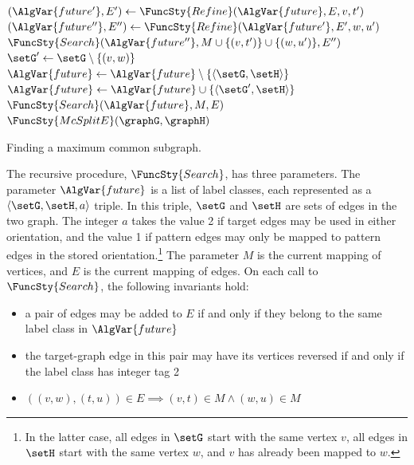 \begin{algorithm}[htb]
{{{{\nl          $(\AlgVar{future'}, E') \gets \FuncSty{Refine}(\AlgVar{future}, E, v, t')$ \;
\nl          $(\AlgVar{future''}, E'') \gets \FuncSty{Refine}(\AlgVar{future'}, E', w, u')$ \;
\nl          $\FuncSty{Search}(\AlgVar{future''}, M\cup \{(v,t')\} \cup \{(w,u')\}, E'')$ \label{ExpandWithtu} \;
        }
       } 
  }
\nl $\setG' \gets \setG \setminus \{(v,w)\}$ \label{RemoveVW} \;
\nl $\AlgVar{future} \gets \AlgVar{future} \setminus \{\langle \setG,\setH \rangle\}$\;
\nl {} {$\AlgVar{future} \gets \AlgVar{future} \cup \{\langle \setG',\setH \rangle \}$}
\nl $\FuncSty{Search}(\AlgVar{future},M,E)$ \label{ExpandWithoutVW} \;
}
\;
\nl $\FuncSty{McSplitE}(\graphG,\graphH)$ \label{McSplitFun} \;
\nl {}
\caption{Finding a maximum common subgraph.}
\label{McSplitAlg}
\end{algorithm}

The recursive procedure,
$\FuncSty{Search}$, has three parameters.  The parameter $\AlgVar{future}$ is a
list of label classes, each represented as a $\langle \setG, \setH, a\rangle$
triple.  In this triple, $\setG$ and $\setH$ are sets of edges in the two
graph.  The integer $a$ takes the value 2 if target edges may be used in either
orientation, and the value 1 if pattern edges may only be mapped to pattern
edges in the stored orientation.\footnote{In the latter case, all edges in
$\setG$ start with the same vertex $v$, all edges in $\setH$ start with the
same vertex $w$, and $v$ has already been mapped to $w$.}  The parameter $M$ is
the current mapping of vertices, and $E$ is the current mapping of edges.  On
each call to $\FuncSty{Search}$, the following invariants hold:

\begin{itemize}
    \item a pair of edges may be added to $E$ if and only if they belong to the same label class in $\AlgVar{future}$
    \item the target-graph edge in this pair may have its vertices reversed if and only if the label class has integer tag 2
    \item $((v,w),(t,u)) \in E \implies (v,t) \in M \wedge (w,u) \in M$ 
\end{itemize}

